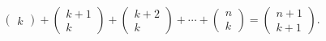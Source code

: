 \begin{enumerate}
$$\begin{pmatrix}
        k
    \end{pmatrix} + \begin{pmatrix}
        k + 1 \\
        k
    \end{pmatrix} + \begin{pmatrix}
        k + 2 \\
        k
    \end{pmatrix} + \cdots + \begin{pmatrix}
        n \\
        k
    \end{pmatrix} = \begin{pmatrix}
        n + 1 \\
        k + 1
    \end{pmatrix}.$$
\end{enumerate}